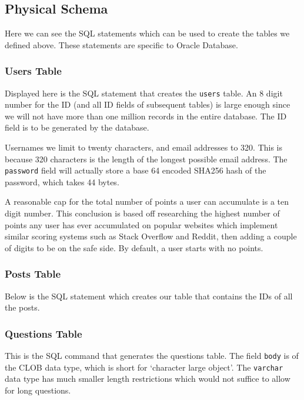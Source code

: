 \subsection{Physical Schema}

Here we can see the SQL statements which can be used to create the tables we defined above. These statements are specific to Oracle Database.

\subsubsection{Users Table}

Displayed here is the SQL statement that creates the \verb`users` table. An 8 digit number for the ID (and all ID fields of subsequent tables) is large enough since we will not have more than one million records in the entire database. The ID field is to be generated by the database.

Usernames we limit to twenty characters, and email addresses to 320. This is because 320 characters is the length of the longest possible email address. The \verb`password` field will actually store a base 64 encoded SHA256 hash of the password, which takes 44 bytes.

A reasonable cap for the total number of points a user can accumulate is a ten digit number. This conclusion is based off researching the highest number of points any user has ever accumulated on popular websites which implement similar scoring systems such as Stack Overflow and Reddit, then adding a couple of digits to be on the safe side. By default, a user starts with no points.


\subsubsection{Posts Table}

Below is the SQL statement which creates our table that contains the IDs of all the posts.


\subsubsection{Questions Table}

This is the SQL command that generates the questions table. The field \verb`body` is of the CLOB data type, which is short for `character large object'. The \verb`varchar` data type has much smaller length restrictions which would not suffice to allow for long questions.

